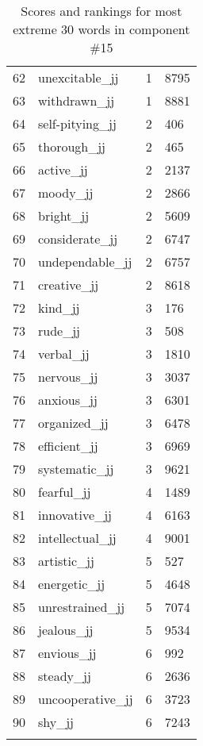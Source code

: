 \begin{longtable}[!htbp]{| rlr@{.}l |}
    62 & unexcitable\_jj & 1 & 8795 \\
    63 & withdrawn\_jj & 1 & 8881 \\
    64 & self-pitying\_jj & 2 & 406 \\
    65 & thorough\_jj & 2 & 465 \\
    66 & active\_jj & 2 & 2137 \\
    67 & moody\_jj & 2 & 2866 \\
    68 & bright\_jj & 2 & 5609 \\
    69 & considerate\_jj & 2 & 6747 \\
    70 & undependable\_jj & 2 & 6757 \\
    71 & creative\_jj & 2 & 8618 \\
    72 & kind\_jj & 3 & 176 \\
    73 & rude\_jj & 3 & 508 \\
    74 & verbal\_jj & 3 & 1810 \\
    75 & nervous\_jj & 3 & 3037 \\
    76 & anxious\_jj & 3 & 6301 \\
    77 & organized\_jj & 3 & 6478 \\
    78 & efficient\_jj & 3 & 6969 \\
    79 & systematic\_jj & 3 & 9621 \\
    80 & fearful\_jj & 4 & 1489 \\
    81 & innovative\_jj & 4 & 6163 \\
    82 & intellectual\_jj & 4 & 9001 \\
    83 & artistic\_jj & 5 & 527 \\
    84 & energetic\_jj & 5 & 4648 \\
    85 & unrestrained\_jj & 5 & 7074 \\
    86 & jealous\_jj & 5 & 9534 \\
    87 & envious\_jj & 6 & 992 \\
    88 & steady\_jj & 6 & 2636 \\
    89 & uncooperative\_jj & 6 & 3723 \\
    90 & shy\_jj & 6 & 7243 \\
    \hline
    \caption{Scores and rankings for most extreme 30 words in component \#15} \\
\end{longtable}

